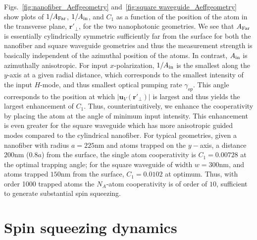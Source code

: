 \documentclass[aps,pra,twocolumn,superscriptaddress]{revtex4-1} %
\newcommand{\mbf}[1]{\mathbf{#1}}
\newcommand{\AF}{A_{\rm Far}} %
\newcommand{\Ai}{A_{\rm in}} %
\begin{document}
Figs.~\ref{fig:nanofiber_Aeffgeometry} and~\ref{fig:square waveguide_Aeffgeometry} show plots of $1/\AF$, $1/\Ai$, and $C_1$ as a function of  the position of the atom in the transverse plane, $\mbf{r}'_\perp$, for the two nanophotonic geometries.  We see that $\AF$ is essentially cylindrically symmetric sufficiently far from the surface for both the nanofiber and square waveguide geometries and thus the measurement strength is basically independent of the azimuthal position of the atoms.  In contrast, $\Ai$ is azimuthally anisotropic.  For input $x$-polarization, $1/\Ai$ is the smallest along the $y$-axis at a given radial distance, which corresponds to the smallest intensity of the input $H$-mode, and thus smallest optical pumping rate $\gamma_{op}$.  This angle corresponds to the position at which $\vert \mbf{u}_V (\mbf{r}'_\perp) \vert$ is largest and thus yields the largest enhancement of $C_1$.  Thus, counterintuitively, we enhance the cooperativity by placing the atom at the angle of minimum input intensity.   This enhancement is even greater for the square waveguide which has more anisotropic guided modes compared to the cylindrical nanofiber.  For typical geometries, given a nanofiber with radius $a = 225$nm and atoms trapped on the $y-$axis, a distance $200$nm ($0.8a$) from the surface, the single atom cooperativity is $C_1 =0.00728$ at the optimal trapping angle; for the square waveguide of width $w =300$nm, and atoms trapped $150$nm from the surface, $C_1 =0.0102$ at optimum.  Thus, with order 1000 trapped atoms the $N_A$-atom cooperativity is of order of $ 10 $, sufficient to generate substantial spin squeezing.

\section{Spin squeezing dynamics}
\end{document}
